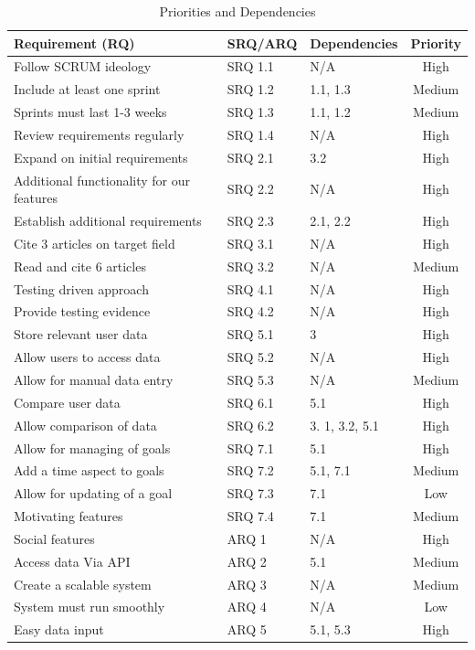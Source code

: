 \documentclass[12pt]{article}
\begin{document}
\begin{table}[h!]
\begin{center}
\begin{tabular}{|l|l|l|c|}
    \hline 
    \textbf{Requirement (RQ)} & \textbf{SRQ/ARQ} & \textbf{Dependencies} & \textbf{Priority} \\ 
    \hline
    Follow SCRUM ideology & SRQ 1.1 & N/A & High \\ 
    \hline
    Include at least one sprint & SRQ 1.2 & 1.1, 1.3 & Medium \\
    \hline
    Sprints must last 1-3 weeks & SRQ 1.3 & 1.1, 1.2 & Medium \\
    \hline
    Review requirements regularly & SRQ 1.4 & N/A & High \\
    \hline
    Expand on initial requirements & SRQ 2.1 & 3.2 & High \\ 
    \hline
    Additional functionality for our features & SRQ 2.2 & N/A & High \\
    \hline
    Establish additional requirements & SRQ 2.3 & 2.1, 2.2 & High \\ 
    \hline
    Cite 3 articles on target field & SRQ 3.1 & N/A & High \\ 
    \hline
    Read and cite 6 articles & SRQ 3.2 & N/A & Medium \\
    \hline
    Testing driven approach & SRQ 4.1 & N/A & High \\ 
    \hline
    Provide testing evidence & SRQ 4.2 & N/A & High \\
    \hline
    Store relevant user data & SRQ 5.1 & 3 & High \\ 
    \hline
    Allow users to access data & SRQ 5.2 & N/A & High \\ 
    \hline
    Allow for manual data entry & SRQ 5.3 & N/A & Medium \\ 
    \hline
    Compare user data & SRQ 6.1 & 5.1 & High \\ 
    \hline
    Allow comparison of data & SRQ 6.2 & 3. 1, 3.2, 5.1 & High \\
    \hline    
    Allow for managing of goals & SRQ 7.1 & 5.1 & High \\ 
    \hline
    Add a time aspect to goals & SRQ 7.2 & 5.1, 7.1 & Medium \\ 
    \hline
    Allow for updating of a goal & SRQ 7.3 & 7.1 & Low \\ 
    \hline
    Motivating features & SRQ 7.4 & 7.1 & Medium \\ 
    \hline
    Social features & ARQ 1 & N/A & High \\ 
    \hline 
    Access data Via API & ARQ 2 & 5.1 & Medium \\
    \hline
    Create a scalable system & ARQ 3 & N/A & Medium \\ 
    \hline
    System must run smoothly & ARQ 4 & N/A & Low \\ 
    \hline
    Easy data input & ARQ 5 & 5.1, 5.3 & High \\
    \hline

\end{tabular}
\caption{Priorities and Dependencies}
\label{tab:priorities_dependencies}
\end{center}
\end{table}
\end{document}
